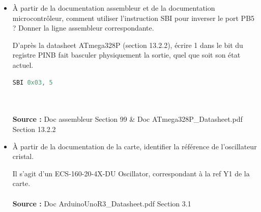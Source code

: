 \documentclass[a4paper,11pt]{article}
\begin{document}
\begin{itemize}
    \item À partir de la documentation assembleur et de la documentation microcontrôleur, comment utiliser l'instruction SBI pour inverser le port PB5 ? Donner la ligne assembleur correspondante.
    \begin{solution}
        D'après la datasheet ATmega328P (section 13.2.2), écrire 1 dans le bit du registre PINB fait basculer physiquement la sortie, quel que soit son état actuel.
        \begin{lstlisting}[language=asm]
SBI 0x03, 5
        \end{lstlisting}\\\\
        \textbf{Source :} Doc assembleur Section 99 \& Doc ATmega328P\_Datasheet.pdf Section 13.2.2
    \end{solution}

    \item À partir de la documentation de la carte, identifier la référence de l'oscillateur cristal.
    \begin{solution}
        Il s'agit d'un ECS-160-20-4X-DU Oscillator, correspondant à la ref Y1 de la carte.\\\\
        \textbf{Source :} Doc ArduinoUnoR3\_Datasheet.pdf Section 3.1
    \end{solution}


\end{itemize}
\end{document}
